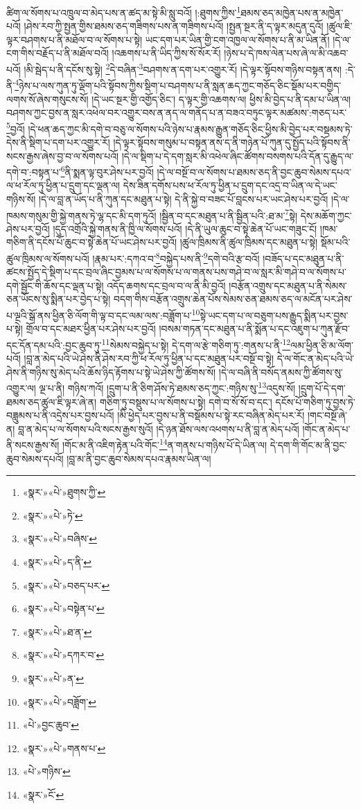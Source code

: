 ཚིག་ལ་སོགས་པ་འཁྲུལ་བ་མེད་པས་ན་ཚད་མ་སྟེ་མི་སླུ་བའོ། །:ཐུགས་ཀྱིས་\footnote{«སྣར་»«པེ་»ཐུགས་ཀྱི་}ཐམས་ཅད་མཁྱེན་པས་ན་མཁྱེན་པའོ། །ཤེས་རབ་ཀྱི་སྤྱན་གྱིས་ཐམས་ཅད་གཟིགས་པས་ན་གཟིགས་པའོ། །སྤྱན་སྔར་ནི་ད་ལྟར་མདུན་དུའོ། །ཚུལ་ཇི་ལྟར་བཤགས་པ་ནི་མཐོལ་བ་ལ་སོགས་པ་སྟེ། ཡང་དག་པར་ཡིན་གྱི་ངག་འཁྱལ་ལ་སོགས་པ་ནི་མ་ཡིན་ནོ། །དེ་ལ་ངག་གིས་བརྗོད་པ་ནི་མཐོལ་བའོ། །འཆགས་པ་ནི་ཡིད་ཀྱིས་སོ་སོར་རོ། །ཉེས་པ་དེ་ཁས་ལེན་པས་ཞེ་ལ་མི་འཆབ་པའོ། །མི་སྦེད་པ་ནི་དངོས་སུ་སྟེ། \footnote{«སྣར་»«པེ་»ཏེ་}དེ་བཞིན་\footnote{«སྣར་»«པེ་»བཞིས་}བཤགས་ན་དག་པར་འགྱུར་རོ། །དེ་ལྟར་སྟོབས་གཉིས་བསྟན་ནས། :དེ་ནི་\footnote{«སྣར་»«པེ་»ད་ནི་}ཉེས་པ་ལས་ཀུན་ཏུ་ལྡོག་པའི་སྟོབས་ཀྱིས་སྡིག་པ་བཤགས་པ་ནི་སླན་ཆད་ཀྱང་གཅོད་ཅིང་སྡོམ་པར་བགྱིད་ལགས་སོ་ཞེས་གསུངས་སོ། །དེ་ཡང་སྔར་གྱི་འགྱོད་ཅིང་། ད་ལྟར་གྱི་འཆགས་ལ། ཕྱིས་མི་བྱེད་པ་ནི་དམ་པ་ཡིན་ལ། བཤགས་ཀྱང་བྱས་ན་སླར་འཕེལ་བར་འགྱུར་བས་ན་ནད་ལ་གནོད་པ་ན་བཟའ་བཏུང་ལྟར་མཚམས་:གཅད་པར་\footnote{«སྣར་»«པེ་»བཅད་པར་}བྱའོ། །དེ་ཕན་ཆད་ཀྱང་མི་དགེ་བ་བཅུ་ལ་སོགས་པའི་ཉེས་པ་རྣམས་རྒྱུན་གཅོད་ཅིང་ཕྱིས་མི་བྱེད་པར་བསྡམས་ཏེ་དེས་ནི་སྡིག་པ་དག་པར་འགྱུར་རོ། །དེ་ལྟར་སྟོབས་གསུམ་པ་བསྟན་ནས་ད་ནི་གཉེན་པོ་ཀུན་དུ་སྤྱོད་པའི་སྟོབས་ནི་སངས་རྒྱས་ཞེས་བྱ་བ་ལ་སོགས་པའོ། །དེ་ལ་སྡིག་པ་དེ་དག་སླར་མི་འཕེལ་ཞིང་ཚོགས་བསགས་པའི་དོན་དུ་རྒྱུད་ལ་དགེ་བ་:བསྟན་པ་\footnote{«སྣར་»«པེ་»བསྟེན་པ་}ནི་སྨན་ལྟ་བུར་ཤེས་པར་བྱའོ། །དེ་ལ་བསྔོ་བ་ལ་སོགས་པ་ཐམས་ཅད་ནི་བྱང་ཆུབ་སེམས་དཔའ་ལ་ཕ་རོལ་ཏུ་ཕྱིན་པ་དྲུག་དང་ལྡན་ལ། དེས་ཟིན་དགོས་པས་ཕ་རོལ་ཏུ་ཕྱིན་པ་དྲུག་དང་འདྲ་བ་ཡིན་ལ་དེ་ཡང་གཉིས་སོ། །དེ་ལ་བླ་ན་ཡོད་པ་ནི་ཀུན་དང་མཐུན་པ་སྟེ། དེ་ནི་སྐྱེ་བ་བཟང་པོ་བླངས་པར་ཡང་ཤེས་པར་བྱའོ། །དེ་ལ་ཁམས་གསུམ་གྱི་སྐྱེ་གནས་ཏེ་ལྷ་དང་མི་དག་ཏུའོ། །སྦྱིན་བ་དང་མཐུན་པ་ནི་སྦྱིན་པའི་:ཐ་མ་\footnote{«སྣར་»«པེ་»ཐ་ན་}སྟེ། དེས་མཆོག་ཀྱང་ཤེས་པར་བྱའོ། །དུད་འགྲོའི་སྐྱེ་གནས་ནི་ཁྱི་ལ་སོགས་པའོ། །དེ་ནི་ཡུལ་ཆུང་བ་སྟེ་ཆེན་པོ་ཡང་གཟུང་ངོ། །ཁམ་གཅིག་ནི་དངོས་པོ་ཆུང་བ་སྟེ་ཆེན་པོ་ཡང་ཤེས་པར་བྱའོ། །ཚུལ་ཁྲིམས་ནི་ཚུལ་ཁྲིམས་དང་མཐུན་པ་སྟེ། སྡོམ་པའི་ཚུལ་ཁྲིམས་ལ་སོགས་པའོ། །རྣམ་པར་:དཀའ་བ་\footnote{«སྣར་»«པེ་»དཀར་བ་}བསྐྱེད་པས་ནི་\footnote{«སྣར་»«པེ་»ན་}དགེ་བའི་རྩ་བའོ། །བཟོད་པ་དང་མཐུན་པ་ནི་ཚངས་སྤྱོད་དེ་སྡིག་པ་དང་བྲལ་ཞིང་བྱམས་པ་ལ་སོགས་པ་ལ་གནས་པས་གཤེ་བ་ལ་སླར་མི་གཤེ་བ་ལ་སོགས་པ་དགེ་སྦྱོང་གི་ཆོས་དང་ལྡན་པ་སྟེ། འདོད་ཆགས་དང་བྲལ་བ་ལ་ནི་མི་བྱའོ། །བརྩོན་འགྲུས་དང་མཐུན་པ་ནི་སེམས་ཅན་ཡོངས་སུ་སྨིན་པར་བྱེད་པ་སྟེ། བདག་གིས་བརྩོན་འགྲུས་ཆེན་པོས་སེམས་ཅན་ཐམས་ཅད་ལ་མངོན་པར་ཤེས་པ་ལྔའི་སྒོ་ནས་ཕྱིན་ཅི་ལོག་གི་ལྟ་བ་དང་ལམ་ལས་:བཟློག་པ་\footnote{«སྣར་»«པེ་»བཟློག་}སྟེ་ཡང་དག་པ་ལ་བཅུག་པས་རྒྱུད་སྨིན་པར་བྱས་པ་སྟེ། གྲོལ་བ་དང་མཐར་ཕྱིན་པར་ཤེས་པར་བྱའོ། །བསམ་གཏན་དང་མཐུན་པ་ནི་སྨོན་པ་དང་འཇུག་པ་ཀུན་རྫོབ་དང་དོན་དམ་པའི་:བྱང་ཆུབ་ཏུ་\footnote{«པེ་»བྱང་ཆུབ་}སེམས་བསྐྱེད་པ་སྟེ། དེ་དག་ལ་རྩེ་གཅིག་ཏུ་:གནས་པ་ནི་\footnote{«སྣར་»«པེ་»གནས་པ་}ལམ་ཕྱིན་ཅི་མ་ལོག་པའོ། །བླ་ན་མེད་པའི་ཡེ་ཤེས་ནི་ཤེས་རབ་ཀྱི་ཕ་རོལ་ཏུ་ཕྱིན་པ་དང་མཐུན་པར་བསྔོ་བ་སྟེ། དེ་ལ་གོང་ན་མེད་པའི་ཡེ་ཤེས་ནི་གཉིས་སུ་མེད་པའི་ཆོས་ཉིད་རྟོགས་པ་སྟེ་ཡེ་ཤེས་ཀྱི་ཚོགས་སོ། །དེ་ལ་བཞི་ནི་བསོད་ནམས་ཀྱི་ཚོགས་སུ་འགྱུར་ལ། ལྔ་པ་ནི། གཉིས་ཀའོ། །དྲུག་པ་ནི་ཅིག་ཤོས་ཏེ་ཐམས་ཅད་ཀྱང་:གཉིས་སུ་\footnote{«པེ་»གཉིས་}འདུས་སོ། །དྲུག་པོ་དེ་དག་ཐམས་ཅད་ཚུལ་ཇི་ལྟར་ཞེ་ན། གཅིག་ཏུ་བསྡུས་པ་ལ་སོགས་པ་སྟེ། དགེ་བ་སོ་སོ་བ་དང་། དངོས་པོ་གཅིག་ཏུ་བྱས་ཏེ་བཟླུམས་པ་ནི་འདྲེས་པར་བྱས་པའོ། །མི་ཕྱེད་པར་བྱས་པ་ནི་བསྡོམས་པ་སྟེ་རང་བཞིན་མེད་པར་རོ། །གང་བསྔོ་ཞེ་ན། བླ་ན་མེད་པ་ལ་སོགས་པའི་སངས་རྒྱས་སུའོ། །དེ་ཉན་ཐོས་ལས་འཕགས་པ་ནི་བླ་ན་མེད་པའོ། །གོང་ན་མེད་པ་ནི་སངས་རྒྱས་སོ། །གོང་མ་ནི་འཇིག་རྟེན་པའི་གོང་\footnote{«སྣར་»ངོ་}ན་གནས་པ་གཉིས་པོ་དེ་ཡིན་ལ། དེ་དག་གི་གོང་མ་ནི་བྱང་ཆུབ་སེམས་དཔའོ། །བླ་མ་ནི་བྱང་ཆུབ་སེམས་དཔའ་རྣམས་ཡིན་ལ། 